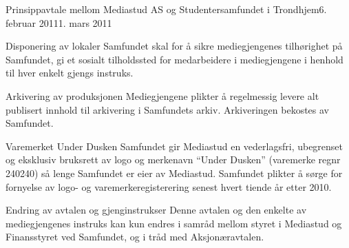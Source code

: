 \begin{instruks}{Prinsippavtale mellom Mediastud AS og Studentersamfundet i Trondhjem}{6. februar 2011}{1. mars 2011}
    \begin{instruksledd}{Disponering av lokaler }
        Samfundet skal for å sikre mediegjengenes tilhørighet på Samfundet, gi et sosialt
        tilholdssted for
        medarbeidere i mediegjengene i henhold til hver enkelt gjengs instruks.
    \end{instruksledd}

    \begin{instruksledd}{Arkivering av produksjonen}
        Mediegjengene plikter å regelmessig levere alt publisert innhold til arkivering i
        Samfundets arkiv.  Arkiveringen bekostes av Samfundet.
    \end{instruksledd}
\pagebreak
    \begin{instruksledd}{Varemerket Under Dusken }
        Samfundet gir Mediastud en vederlagsfri, ubegrenset og eksklusiv bruksrett av logo
        og merkenavn
        ``Under Dusken'' (varemerke regnr 240240) så lenge Samfundet er eier av Mediastud.
        Samfundet
        plikter å sørge for fornyelse av logo- og varemerkeregisterering senest hvert
        tiende år etter 2010.
    \end{instruksledd}

    \begin{instruksledd}{ Endring av avtalen og gjenginstrukser } 
        Denne avtalen og den enkelte av mediegjengenes instruks kan kun endres i samråd
        mellom styret i
        Mediastud og Finansstyret ved Samfundet, og i tråd med Aksjonæravtalen.
    \end{instruksledd}

\end{instruks}


